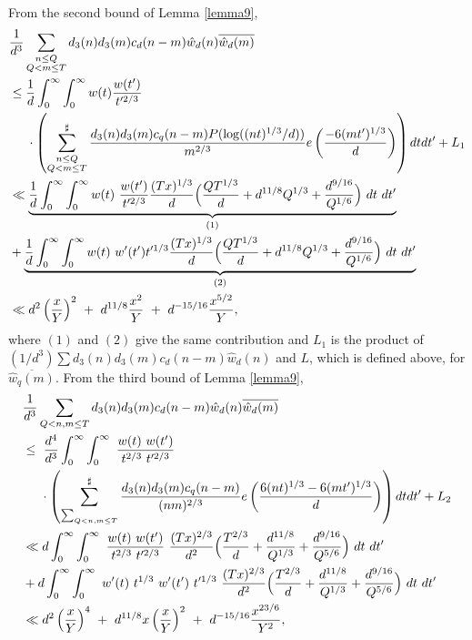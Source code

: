 \documentclass[oneside,reqno,10pt]{amsart}
\numberwithin{equation}{section}
\theoremstyle{plain}
\theoremstyle{definition}
\numberwithin{equation}{section}
\begin{document}
From the second bound of Lemma \ref{lemma9},
\begin{align}\label{2.}\nonumber
    &\frac{1}{d^3} \sum_{\substack{n\leq Q\\ Q<m\leq T}} d_3(n)d_3(m)c_d(n-m)\hat{w}_d(n)\overline{\hat{w}_d(m)}\\ \nonumber
    &\leq\frac{1}{d} \int_{0}^{\infty}\int_{0}^{\infty} w(t)\frac{w(t')}{t'^{2/3}}\\ \nonumber
    &\hspace{0,5cm} \cdot \left(\sum_{\substack{n\leq Q\\Q < m \leq T}}^{\sharp} \frac{d_{3}(n)d_{3}(m)c_{q}(n-m)P(\log ((nt)^{1/3}/d))}{m^{2/3}} e\left(\frac{-6(mt')^{1/3}}{d}\right) \right)dtdt' +L_1\\ \nonumber
    &\ll  \underbrace{\frac{1}{d} \int_{0}^{\infty}\int_{0}^{\infty} w(t)\ \frac{w(t')}{t'^{2/3}} \frac{(Tx)^{1/3}}{d} \Big( \frac{QT^{1/3}}{d}+d^{11/8}Q^{1/3}+\frac{d^{9/16}}{Q^{1/6}}\Big)\ dt\ dt'}_{(1)}\\ \nonumber
    &+\underbrace{\frac{1}{d} \int_{0}^{\infty}\int_{0}^{\infty} w(t)\ w'(t')t'^{1/3} \frac{(Tx)^{1/3}}{d} \Big( \frac{QT^{1/3}}{d}+d^{11/8}Q^{1/3}+\frac{d^{9/16}}{Q^{1/6}}\Big)\ dt\ dt'}_{(2)}\\
    &\ll d^2\left(\frac{x}{Y}\right)^2\ +\ d^{11/8} \frac{x^2}{Y}\ +\ d^{-15/16}\frac{x^{5/2}}{Y},
\end{align}
where $(1)$ and $(2)$ give the same contribution and $L_1$ is the product of $(1/d^3) \sum d_3(n)d_3(m)c_d(n-m)\hat{w}_d(n)$ and $L$, which is defined above, for $\overline{\hat{w}_q(m)}$. From the third bound of Lemma \ref{lemma9},
\begin{align}\label{3.}\nonumber
     &\frac{1}{d^3} \sum_{Q < n,m \leq T} d_3(n)d_3(m)c_d(n-m)\hat{w}_d(n)\overline{\hat{w}_d(m)}\\ \nonumber
     &\leq\ \frac{d^4}{d^3}\int_{0}^{\infty}\int_{0}^{\infty} \ \frac{w(t)\ w(t')}{t^{2/3}\ t'^{2/3}}\\ \nonumber
     &\hspace{0,5cm} \cdot \left(\sum_{\sum_{Q < n,m \leq T}}^{\sharp} \frac{d_{3}(n)d_{3}(m)c_{q}(n-m)}{(nm)^{2/3}} e\left(\frac{6(nt)^{1/3}-6(mt')^{1/3}}{d}\right) \right)dtdt'+L_2\\ \nonumber
     &\ll d\int_{0}^{\infty}\int_{0}^{\infty} \ \frac{w(t)\ w(t')}{t^{2/3}\ t'^{2/3}}\ \frac{(Tx)^{2/3}}{d^2} \Big( \frac{T^{2/3}}{d}+\frac{d^{11/8}}{Q^{1/3}}+\frac{d^{9/16}}{Q^{5/6}}\Big)\ dt\ dt'\\ \nonumber
     &+ d\int_{0}^{\infty}\int_{0}^{\infty} \ w'(t)\ t^{1/3}\ w'(t')\ t'^{1/3}\ \frac{(Tx)^{2/3}}{d^2} \Big( \frac{T^{2/3}}{d}+\frac{d^{11/8}}{Q^{1/3}}+\frac{d^{9/16}}{Q^{5/6}}\Big)\ dt\ dt'\\
     &\ll d^2\left(\frac{x}{Y}\right)^4\ +\ d^{11/8}x\left(\frac{x}{Y}\right)^2\ +\ d^{-15/16}\frac{x^{23/6}}{Y^2},
\end{align}
\end{document}
